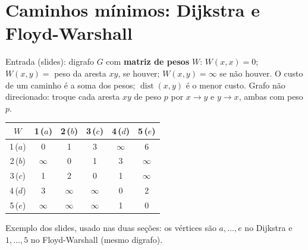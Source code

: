 \section{Caminhos mínimos: Dijkstra e Floyd-Warshall}\label{sec:caminhos}
Entrada (slides): digrafo $G$ com \textbf{matriz de pesos} $W$: $W(x,x)=0$; $W(x,y)=$ peso da aresta $xy$, se houver; $W(x,y)=\infty$ se não houver. O custo de um caminho é a soma dos pesos; $\operatorname{dist}(x,y)$ é o menor custo. Grafo não direcionado: troque cada aresta $xy$ de peso $p$ por $x\to y$ e $y\to x$, ambas com peso $p$.
\begin{center}\small
\begin{tabular}{c|ccccc}
$W$ & 1\,($a$) & 2\,($b$) & 3\,($c$) & 4\,($d$) & 5\,($e$)\\ \hline
1\,($a$) & 0 & 1 & 3 & $\infty$ & 6\\
2\,($b$) & $\infty$ & 0 & 1 & 3 & $\infty$\\
3\,($c$) & 1 & 2 & 0 & 1 & $\infty$\\
4\,($d$) & 3 & $\infty$ & $\infty$ & 0 & 2\\
5\,($e$) & $\infty$ & $\infty$ & $\infty$ & 1 & 0
\end{tabular}
\qquad
\begin{minipage}{0.4\linewidth}\small
Exemplo dos slides, usado nas duas seções: os vértices são $a,\dots,e$ no Dijkstra e $1,\dots,5$ no Floyd-Warshall (mesmo digrafo).
\end{minipage}
\end{center}

